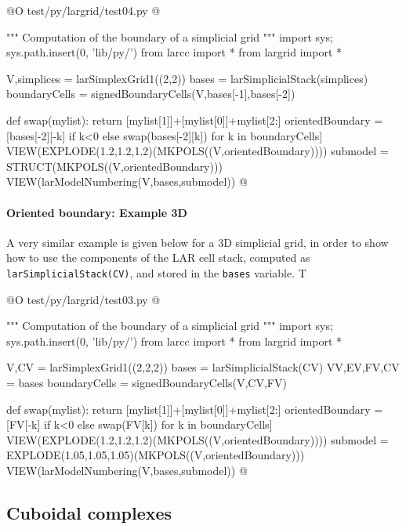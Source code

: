 \documentclass[11pt,oneside]{article}	%
\begin{document}
@O test/py/largrid/test04.py
@{""" Computation of the boundary of a simplicial grid """
import sys; sys.path.insert(0, 'lib/py/')
from larcc import *
from largrid import *

V,simplices = larSimplexGrid1((2,2))
bases = larSimplicialStack(simplices)
boundaryCells = signedBoundaryCells(V,bases[-1],bases[-2])

def swap(mylist): return [mylist[1]]+[mylist[0]]+mylist[2:]
orientedBoundary = [bases[-2][-k] if k<0 else swap(bases[-2][k]) 
						for k in boundaryCells]
VIEW(EXPLODE(1.2,1.2,1.2)(MKPOLS((V,orientedBoundary))))
submodel = STRUCT(MKPOLS((V,orientedBoundary)))
VIEW(larModelNumbering(V,bases,submodel))
@}


\paragraph{Oriented boundary: Example 3D}
A very similar example is given below for a 3D simplicial grid, in order to show 
how to use the components of the LAR cell stack, computed as \texttt{larSimplicialStack(CV)}, and stored in the \texttt{bases} variable. T

@O test/py/largrid/test03.py
@{""" Computation of the boundary of a simplicial grid """
import sys; sys.path.insert(0, 'lib/py/')
from larcc import *
from largrid import *

V,CV = larSimplexGrid1((2,2,2))
bases = larSimplicialStack(CV)
VV,EV,FV,CV = bases
boundaryCells = signedBoundaryCells(V,CV,FV)

def swap(mylist): return [mylist[1]]+[mylist[0]]+mylist[2:]
orientedBoundary = [FV[-k] if k<0 else swap(FV[k]) for k in boundaryCells]
VIEW(EXPLODE(1.2,1.2,1.2)(MKPOLS((V,orientedBoundary))))
submodel = EXPLODE(1.05,1.05,1.05)(MKPOLS((V,orientedBoundary)))
VIEW(larModelNumbering(V,bases,submodel))
@}

\subsection{Cuboidal complexes}
\end{document}
